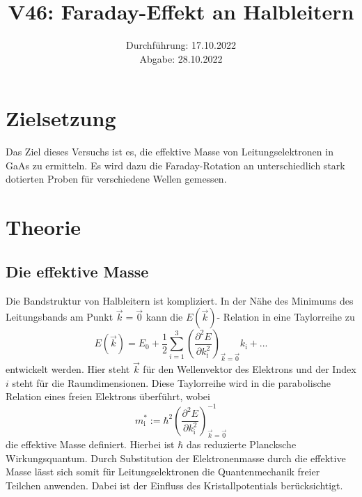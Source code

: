 \documentclass[
  bibliography=totoc,     %
  captions=tableheading,  %
  titlepage=firstiscover, %
]{scrartcl}
\title{V46: Faraday-Effekt an Halbleitern}
\author{
  Martin Schönfeld
  \texorpdfstring{
    \\
    \href{mailto:martin.schoenfeld@udo.edu}{martin.schoenfeld@udo.edu}
  }{}
  \texorpdfstring{\and}{, }
  Tim Sedlaczek
  \texorpdfstring{
    \\
    \href{mailto:tim.sedlaczek@udo.edu}{tim.sedlaczek@udo.edu}
  }{}
}
\date{Durchführung: 17.10.2022\\
      Abgabe: 28.10.2022}
\begin{document}
\maketitle
\thispagestyle{empty}
\setcounter{page}{1}

\section{Zielsetzung}
\label{sec:Zielsetzung}

Das Ziel dieses Versuchs ist es, die effektive Masse von Leitungselektronen in
GaAs zu ermitteln.
Es wird dazu die Faraday-Rotation an unterschiedlich stark
dotierten Proben für verschiedene Wellen gemessen.

\section{Theorie}
\label{sec:Theorie}

\subsection{Die effektive Masse}
\label{sec:effMasse}
Die Bandstruktur von Halbleitern ist kompliziert. 
In der Nähe des Minimums des
Leitungsbands am Punkt $\vec{k} = \vec{0}$ kann die $E\left(\vec{k}\right)$-
Relation in eine Taylorreihe zu
\begin{equation*}
  E\left(\vec{k}\right) = E_\text{0} +
  \frac{1}{2} \sum_{i = 1}^3
  \left(\frac{\partial^2 E}{\partial k_\text{i}^2}\right)_{\vec{k} = \vec{0}}
  k_\text{i} + ...
\end{equation*}
entwickelt werden.
Hier steht $\vec{k}$ für den Wellenvektor des Elektrons und der Index
$i$ steht für die Raumdimensionen.
Diese Taylorreihe wird in die parabolische Relation eines freien Elektrons
überführt, wobei
\begin{equation}
  m_\text{i}^* := \hbar^2
  \left(\frac{\partial^2 E}{\partial k_\text{i}^2}\right)_{\vec{k} = \vec{0}}^{-1}
  \label{eqn:effMasse}
\end{equation}
die effektive Masse definiert.
Hierbei ist $\hbar$ das reduzierte Plancksche Wirkungsquantum.
Durch Substitution der Elektronenmasse durch die effektive Masse lässt
sich somit für Leitungselektronen die Quantenmechanik freier Teilchen
anwenden. Dabei ist der Einfluss des Kristallpotentials berücksichtigt.
\end{document}
